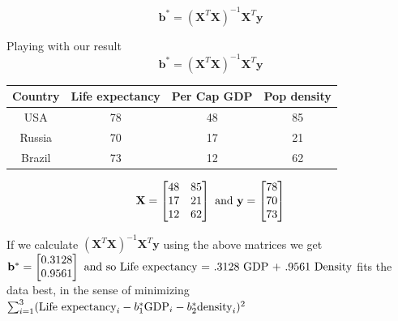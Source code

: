 \documentclass[10pt]{seminar}
\begin{document}
\begin{slide}
$$ \mathbf{b}^*=  (\mathbf{X}^T\mathbf{X})^{-1}\mathbf{X}^T\mathbf{y}  $$
\newslide


    Playing with our result  $$\mathbf{b}^*=(\mathbf{X}^T \mathbf{X})^{-1}\mathbf{X}^T\mathbf{y}$$ 
\begin{center}
\begin{tabular}{c|c|c|c}

Country & Life expectancy & Per Cap GDP& Pop density \\ \hline \hline

USA & 78&48 &85\\
Russia & 70&17 &21 \\
Brazil  &73 &12 & 62
\end{tabular}
    \end{center}
$$    \mathbf{X}= \begin{bmatrix} 48&85\\17&21\\12&62
\end{bmatrix} \hbox{ and }
  \mathbf{y}= \begin{bmatrix} 78\\70\\73
\end{bmatrix}
$$

If we calculate $(\mathbf{X}^T \mathbf{X})^{-1}\mathbf{X}^T\mathbf{y}$ using the above matrices we get $\mathbf{b}^*=\begin{bmatrix} 0.3128 \\0.9561
\end{bmatrix}
\hbox{ and so  Life expectancy = .3128 GDP + .9561 Density} 
$ fits the data best, in the sense of minimizing $\sum_{i=1}^3(\hbox{Life expectancy}_i-b_1^*\hbox{GDP}_i-b_2^*\hbox{density}_i)^2$
    
 \end{slide}
 
 
\end{document}
